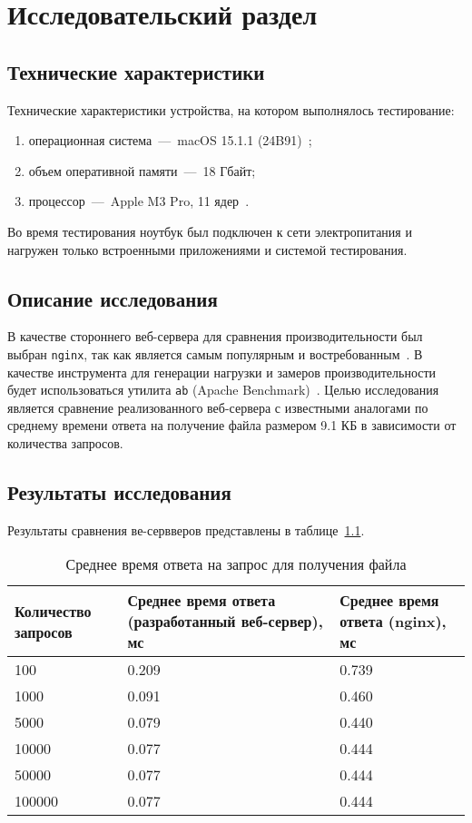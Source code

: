 \chapter{Исследовательский раздел}

\section{Технические характеристики}

Технические характеристики устройства, на котором выполнялось тестирование:
\begin{enumerate}
	\item операционная система~---~macOS 15.1.1 (24B91)~\cite{macos}; 
	\item объем оперативной памяти~---~18 Гбайт;
	\item процессор~---~Apple M3 Pro, 11 ядер~\cite{macos}.
\end{enumerate}

Во время тестирования ноутбук был подключен к сети электропитания и нагружен только встроенными приложениями и системой тестирования.

\section{Описание исследования}

В качестве стороннего веб-сервера для сравнения производительности был выбран \texttt{nginx}, так как является самым популярным и востребованным~\cite{nginx}.
В качестве инструмента для генерации нагрузки и замеров производительности будет использоваться утилита \texttt{ab} (Apache Benchmark)~\cite{ab}.
Целью исследования является сравнение реализованного веб-сервера с известными аналогами по среднему времени ответа на получение файла размером 9.1 КБ в зависимости от количества запросов.

\section{Результаты исследования}

Результаты сравнения ве-сервверов представлены в таблице~\ref{table1}.
\begin{table}[!ht]
	\centering
	\caption{Среднее время ответа на запрос для получения файла}
	\label{table1}
	\begin{tabularx}{\textwidth}{|X|X|X|}
		\hline
		Количество запросов & Среднее время ответа (разработанный веб-сервер), мс & Среднее время ответа (nginx), мс \\ \hline
		100 & 0.209 & 0.739 \\ \hline
		1000 & 0.091 & 0.460 \\ \hline
		5000 & 0.079 & 0.440 \\ \hline
		10000 & 0.077 & 0.444 \\ \hline
		50000 & 0.077 & 0.444 \\ \hline
		100000 & 0.077 & 0.444 \\ \hline
	\end{tabularx}
\end{table}

